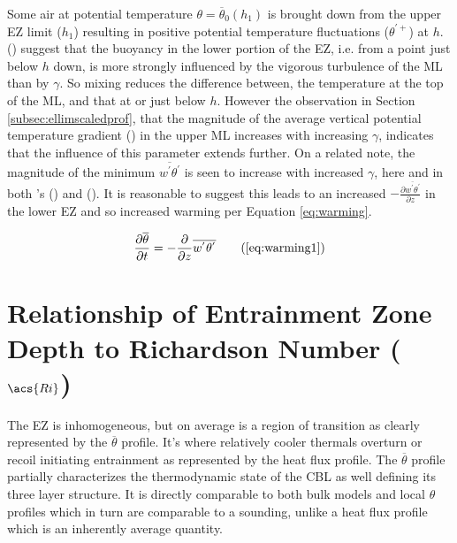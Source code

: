 Some air at potential temperature $\theta = \overline{\theta}_{0}(h_{1})$ is brought down from the upper \acs{EZ} limit ($h_{1}$) resulting in positive potential temperature fluctuations ($\theta^{'+}$) at $h$.\\

\citeauthor{GarciaMellado} (\citeyear{GarciaMellado}) suggest that the buoyancy in the lower portion of the \acs{EZ}, i.e. from a point just below $h$ down, is more strongly influenced by the vigorous turbulence of the \acs{ML} than by $\gamma$.  So mixing reduces the difference between, the temperature at the top of the \acs{ML}, and that at or just below $h$.  However the observation in Section \ref{subsec:ellimscaledprof}, that the magnitude of the average vertical potential temperature gradient () in the upper \acs{ML} increases with increasing $\gamma$, indicates that the influence of this parameter extends further.  On a related note, the magnitude of the minimum $\overline{w^{'}\theta^{'}}$ is seen to increase with increased $\gamma$, here and in both \citeauthor{Sorbjan}'s (\citeyear{Sorbjan}) and \citeauthor{FedConzMir04} (\citeyear{FedConzMir04}).  It is reasonable to suggest this leads to an increased $-\frac{\partial \overline{w^{'}\theta^{'}}}{\partial z}$ in the lower \acs{EZ} and so increased warming per Equation \ref{eq:warming}.

\begin{equation}
\frac{\partial \overline{\theta}}{\partial t} = -\frac{\partial}{\partial z}\overline{w^{'}\theta^{'}} \tag{\ref{eq:warming1}}
\end{equation}

\section{Relationship of Entrainment Zone Depth to Richardson Number ($\acs{Ri}$)}

The \acs{EZ} is inhomogeneous, but on average is a region of transition as clearly represented by the $\overline{\theta}$ profile.  It's where relatively cooler thermals overturn or recoil initiating entrainment as represented by the heat flux profile.  The $\overline{\theta}$ profile partially characterizes the thermodynamic state of the \acs{CBL} as well defining its three layer structure.  It is directly comparable to both bulk models and local $\theta$ profiles which in turn are comparable to a sounding, unlike a heat flux profile which is an inherently average quantity.\\

